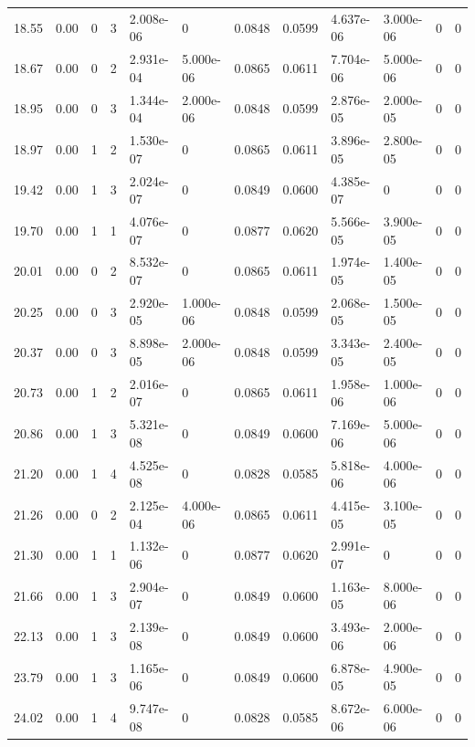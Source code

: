 \documentclass[preview]{standalone}
\begin{document}
{{{\begin{tabular}{L{1.2cm}C{1.2cm} C{0.3cm}C{0.5cm} C{1.4cm}C{1.4cm} C{1.4cm}C{1.4cm} C{1.6cm}C{1.6cm} C{1.6cm}C{1.6cm}}
  18.55  &  0.00  & 0     &  3 &  2.008e-06  & 0  &  0.0848&   0.0599& 4.637e-06 & 3.000e-06   &  0 & 0  \\ 
  18.67  &  0.00  & 0     &  2 &  2.931e-04  & 5.000e-06  &  0.0865&   0.0611& 7.704e-06 & 5.000e-06   &  0 & 0  \\ 
  18.95  &  0.00  & 0     &  3 &  1.344e-04  & 2.000e-06  &  0.0848&   0.0599& 2.876e-05 & 2.000e-05   &  0 & 0  \\ 
  18.97  &  0.00  & 1     &  2 &  1.530e-07  & 0  &  0.0865&   0.0611& 3.896e-05 & 2.800e-05   &  0 & 0  \\ 
  19.42  &  0.00  & 1     &  3 &  2.024e-07  & 0  &  0.0849&   0.0600& 4.385e-07 & 0   &  0 & 0  \\ 
  19.70  &  0.00  & 1     &  1 &  4.076e-07  & 0  &  0.0877&   0.0620& 5.566e-05 & 3.900e-05   &  0 & 0  \\ 
  20.01  &  0.00  & 0     &  2 &  8.532e-07  & 0  &  0.0865&   0.0611& 1.974e-05 & 1.400e-05   &  0 & 0  \\ 
  20.25  &  0.00  & 0     &  3 &  2.920e-05  & 1.000e-06  &  0.0848&   0.0599& 2.068e-05 & 1.500e-05   &  0 & 0  \\ 
  20.37  &  0.00  & 0     &  3 &  8.898e-05  & 2.000e-06  &  0.0848&   0.0599& 3.343e-05 & 2.400e-05   &  0 & 0  \\ 
  20.73  &  0.00  & 1     &  2 &  2.016e-07  & 0  &  0.0865&   0.0611& 1.958e-06 & 1.000e-06   &  0 & 0  \\ 
  20.86  &  0.00  & 1     &  3 &  5.321e-08  & 0  &  0.0849&   0.0600& 7.169e-06 & 5.000e-06   &  0 & 0  \\ 
  21.20  &  0.00  & 1     &  4 &  4.525e-08  & 0  &  0.0828&   0.0585& 5.818e-06 & 4.000e-06   &  0 & 0  \\ 
  21.26  &  0.00  & 0     &  2 &  2.125e-04  & 4.000e-06  &  0.0865&   0.0611& 4.415e-05 & 3.100e-05   &  0 & 0  \\ 
  21.30  &  0.00  & 1     &  1 &  1.132e-06  & 0  &  0.0877&   0.0620& 2.991e-07 & 0   &  0 & 0  \\ 
  21.66  &  0.00  & 1     &  3 &  2.904e-07  & 0  &  0.0849&   0.0600& 1.163e-05 & 8.000e-06   &  0 & 0  \\ 
  22.13  &  0.00  & 1     &  3 &  2.139e-08  & 0  &  0.0849&   0.0600& 3.493e-06 & 2.000e-06   &  0 & 0  \\ 
  23.79  &  0.00  & 1     &  3 &  1.165e-06  & 0  &  0.0849&   0.0600& 6.878e-05 & 4.900e-05   &  0 & 0  \\ 
  24.02  &  0.00  & 1     &  4 &  9.747e-08  & 0  &  0.0828&   0.0585& 8.672e-06 & 6.000e-06   &  0 & 0  \\ 

\end{tabular}}}}
\end{document}

